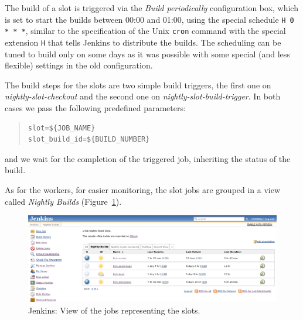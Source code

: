 \documentclass{lhcbnote}
\begin{document}
The build of a slot is triggered via the \emph{Build periodically} configuration
box, which is set to start the builds between 00:00 and 01:00, using the special
schedule \verb|H 0 * * *|, similar to the specification of the Unix
\texttt{cron} command with the special extension \texttt{H} that tells Jenkins
to distribute the builds.  The scheduling can be tuned to build only on some
days as it was possible with some special (and less flexible) settings in the
old configuration.

The build steps for the slots are two simple build triggers, the first one on
\emph{nightly-slot-checkout} and the second one on
\emph{nightly-slot-build-trigger}.  In both cases we pass the following
predefined parameters:
\begin{quote}
\begin{verbatim}
slot=${JOB_NAME}
slot_build_id=${BUILD_NUMBER}
\end{verbatim}
\end{quote}
and we wait for the completion of the triggered job, inheriting the status of
the build.

As for the workers, for easier monitoring, the slot jobs are grouped in a view
called \emph{Nightly Builds} (Figure~\ref{fig:jenkins-slots}).

\begin{figure}
  \begin{center}
    \includegraphics[width=15cm]{images/jenkins-1}
  \end{center}
  \caption{Jenkins: View of the jobs representing the slots.}
  \label{fig:jenkins-slots}
\end{figure}
\end{document}
